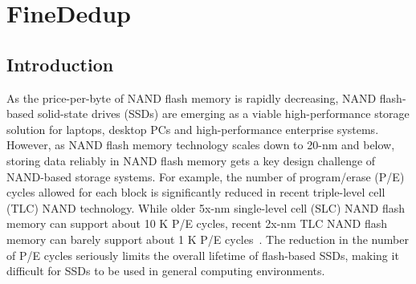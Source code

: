 \chapter{FineDedup} 
\label{chap:FineDedup}

\section{Introduction}
As the price-per-byte of NAND flash memory is rapidly decreasing,
NAND flash-based solid-state drives (SSDs) are emerging as a viable high-performance storage solution
for laptops, desktop PCs and high-performance enterprise systems.
However, as NAND flash memory technology scales down to 20-nm and below, storing data reliably in NAND flash memory
gets a key design challenge of NAND-based storage systems. 
For example, the number of program/erase (P/E) cycles allowed for each block is significantly reduced in recent triple-level cell (TLC)
NAND technology.
While older 5x-nm single-level cell (SLC) NAND flash memory can support about 10 K P/E cycles, recent 2x-nm TLC NAND flash memory
can barely support about 1 K P/E cycles~\cite{tlc}.
The reduction in the number of P/E cycles seriously limits the overall lifetime of flash-based SSDs,
making it difficult for SSDs to be used in general computing environments.

